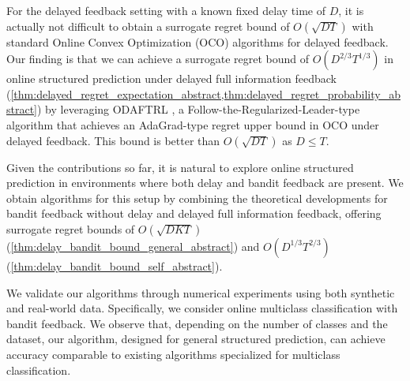 For the delayed feedback setting with a known fixed delay time of $D$, it is actually not difficult to obtain a surrogate regret bound of $O(\sqrt{D T})$ with standard Online Convex Optimization (OCO) algorithms for delayed feedback. 
Our finding is that we can achieve a surrogate regret bound of $O(D^{2/3} T^{1/3})$ in online structured prediction under delayed full information feedback (\cref{thm:delayed_regret_expectation_abstract,thm:delayed_regret_probability_abstract}) by leveraging ODAFTRL \citep{pmlr-v139-flaspohler21a}, a Follow-the-Regularized-Leader-type algorithm that achieves an AdaGrad-type regret upper bound in OCO under delayed feedback. 
This bound is better than $O(\sqrt{D T})$ as $D \le T$.


Given the contributions so far, it is natural to explore online structured prediction in environments where both delay and bandit feedback are present. 
We obtain algorithms for this setup by combining the theoretical developments for bandit feedback without delay and delayed full information feedback, offering surrogate regret bounds of $O(\sqrt{D K T})$ (\cref{thm:delay_bandit_bound_general_abstract}) and $O(D^{1/3} T^{2/3})$ (\cref{thm:delay_bandit_bound_self_abstract}).

We validate our algorithms through numerical experiments using both synthetic and real-world data.  
Specifically, we consider online multiclass classification with bandit feedback. 
We observe that, depending on the number of classes and the dataset, our algorithm, designed for general structured prediction, can achieve accuracy comparable to existing algorithms specialized for multiclass classification.


